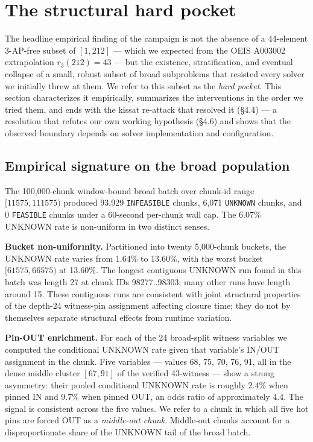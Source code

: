 \section{The structural hard pocket}\label{the-structural-hard-pocket}

The headline empirical finding of the campaign is not the absence of a 44-element
3-AP-free subset of $[1, 212]$ --- which we expected from the OEIS A003002
extrapolation $r_3(212) = 43$ --- but the existence, stratification, and
eventual collapse of a small, robust subset of broad subproblems that
resisted every solver we initially threw at them. We refer to this subset
as the \emph{hard pocket}. This section characterizes it empirically,
summarizes the interventions in the order we tried them, and ends with the
kissat re-attack that resolved it (§4.4) --- a resolution that refutes our
own working hypothesis (§4.6) and shows that the observed boundary depends
on solver implementation and configuration.

\subsection{Empirical signature on the broad population}\label{empirical-signature-on-the-broad-population}

The 100,000-chunk window-bound broad batch over chunk-id range
$[11575, 111575)$ produced 93,929 \texttt{INFEASIBLE} chunks, 6,071 \texttt{UNKNOWN}
chunks, and 0 \texttt{FEASIBLE} chunks under a 60-second per-chunk wall cap. The
6.07\% UNKNOWN rate is non-uniform in two distinct senses.

\textbf{Bucket non-uniformity.} Partitioned into twenty 5,000-chunk buckets, the
UNKNOWN rate varies from 1.64\% to 13.60\%, with the worst bucket
$[61575, 66575)$ at 13.60\%. The longest contiguous UNKNOWN run found in this
batch was length 27 at chunk IDs 98277..98303; many other runs have length
around 15. These contiguous runs are consistent with joint structural
properties of the depth-24 witness-pin assignment affecting closure time;
they do not by themselves separate structural effects from runtime variation.

\textbf{Pin-OUT enrichment.} For each of the 24 broad-split witness variables we
computed the conditional UNKNOWN rate given that variable's IN/OUT assignment
in the chunk. Five variables --- values 68, 75, 70, 76, 91, all in the
dense middle cluster $[67, 91]$ of the verified 43-witness --- show a strong
asymmetry: their pooled conditional UNKNOWN rate is roughly 2.4\% when pinned IN
and 9.7\% when pinned OUT, an odds ratio of approximately 4.4. The signal is consistent
across the five values. We refer to a chunk in which all five hot pins are
forced OUT as a \emph{middle-out chunk}. Middle-out chunks account for a
disproportionate share of the UNKNOWN tail of the broad batch.

